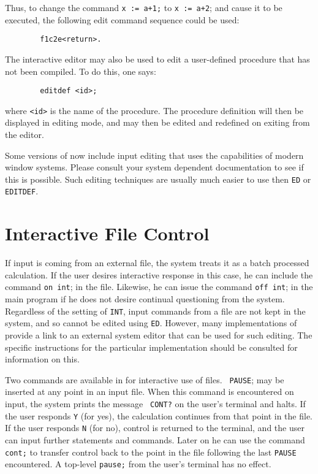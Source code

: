 Thus, to change the command {\tt x := a+1;} to {\tt x := a+2}; and cause
it to be executed, the following edit command sequence could be used:
\begin{verbatim}
        f1c2e<return>.
\end{verbatim}
The interactive editor may also be used to edit a user-defined procedure that
has not been compiled.  To do this, one says:
\begin{verbatim}
        editdef <id>;
\end{verbatim}
where {\tt <id>} is the name of the procedure.  The procedure definition
will then be displayed in editing mode, and may then be edited and
redefined on exiting from the editor.

Some versions of {\REDUCE} now include input editing that uses the
capabilities of modern window systems.  Please consult your system
dependent documentation to see if this is possible.  Such editing
techniques are usually much easier to use then {\tt ED} or {\tt EDITDEF}.

\section{Interactive File Control}
If input is coming from an external file, the system treats it as a batch
processed calculation.  If the user desires interactive
 response in this case, he can include the command
{\tt on int}; in the file.  Likewise, he can issue the
command {\tt off int}; in the main program if he does not desire continual
questioning from the system.  Regardless of the setting of {\tt INT},
input commands from a file are not kept in the system, and so cannot be
edited using {\tt ED}.  However, many implementations of {\REDUCE} provide
a link to an external system editor that can be used for such editing.
The specific instructions for the particular implementation should be
consulted for information on this.

Two commands are available in {\REDUCE} for interactive use of files. {\tt
PAUSE}; may be inserted at any point in an input file.  When
this command is encountered on input, the system prints the message {\tt
CONT?} on the user's terminal and halts.  If the user responds {\tt Y}
(for yes), the calculation continues from that point in the file.  If the
user responds {\tt N} (for no), control is returned to the terminal, and
the user can input further statements and commands.  Later on he can use
the command {\tt cont;} to transfer control back to the
point in the file following the last {\tt PAUSE} encountered.  A top-level
{\tt pause;} from the user's terminal has no effect.

